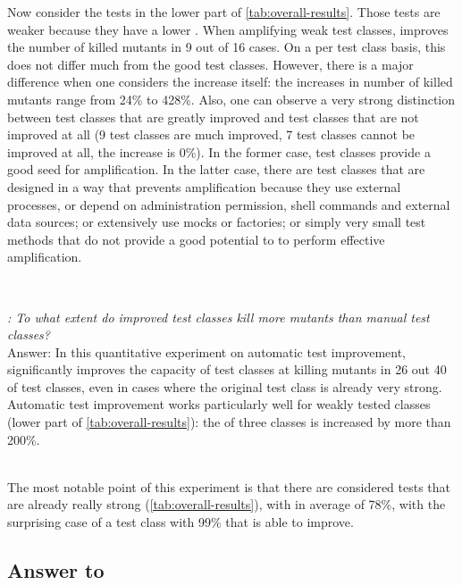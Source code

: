 Now consider the tests in the lower part of \autoref{tab:overall-results}.
Those tests are weaker because they have a lower \ms. 
When amplifying weak test classes, \dspot improves the number of killed mutants in 9 out of 16 cases. 
On a per test class basis, this does not differ much from the good test classes. 
However, there is a major difference when one considers the increase itself: the increases in number of killed mutants range from 24\% to 428\%. 
Also, one can observe a very strong distinction between test classes that are greatly improved and test classes that are not improved at all (9 test classes are much improved, 7 test classes cannot be improved at all, the increase is 0\%). 
In the former case, test classes provide a good seed for amplification. 
In the latter case, there are test classes that are designed in a way that prevents amplification because they use external processes, or depend on administration permission, shell commands and external data sources; or extensively use mocks or factories; or simply very small test methods that do not provide a good potential to \dspot to perform effective amplification.

~\\
\begin{mdframed}
	\textit{\rqeffectiveness: To what extent do improved  test classes kill more mutants than manual test classes?}\\
	Answer: In this quantitative experiment on automatic test improvement, \dspot significantly improves the capacity of test classes at killing mutants in 26 out 40 of test classes, even in cases where the original test class is already very strong. 
	Automatic test improvement works particularly well for weakly tested classes (lower part of \autoref{tab:overall-results}): the \ms of three classes is increased by more than 200\%.
\end{mdframed}
~\\
The most notable point of this experiment is that there are considered tests that are already really strong (\autoref{tab:overall-results}), with \ms in average of 78\%, with the surprising case of a test class with 99\% \ms that \dspot is able to improve. 


\subsection{Answer to \rqAmplVersusIAmpl}
\label{subsec:test-improvement:experiment-results:rq4}

